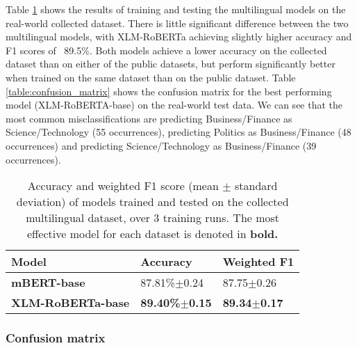 \documentclass{l4proj}
\begin{document}
Table \ref{table:realworld-effectiveness} shows the results of training and testing the multilingual models on the real-world collected dataset. There is little significant difference between the two multilingual models, with XLM-RoBERTa achieving slightly higher accuracy and F1 scores of ~89.5\%. Both models achieve a lower accuracy on the collected dataset than on either of the public datasets, but perform significantly better when trained on the same dataset than on the public dataset.
Table \ref{table:confusion_matrix} shows the confusion matrix for the best performing model (XLM-RoBERTA-base) on the real-world test data. We can see that the most common misclassifications are predicting Business/Finance as Science/Technology (55 occurrences), predicting Politics as Business/Finance (48 occurrences) and predicting Science/Technology as Business/Finance (39 occurrences).  

\begin{table}[]
\begin{tabular}{lll}
\hline
\textbf{Model}   & \textbf{Accuracy} & \textbf{Weighted F1} \\ \hline
\textbf{mBERT-base}       & 87.81\%$\pm$0.24     & 87.75$\pm$0.26        \\
\textbf{XLM-RoBERTa-base} & \textbf{89.40\%$\pm$0.15}     & \textbf{89.34$\pm$0.17}                 \\ \hline
\end{tabular}
\caption{Accuracy and weighted F1 score (mean $\pm$ standard deviation) of models trained and tested on the collected multilingual dataset, over 3 training runs. The most effective model for each dataset is denoted in \textbf{bold.}}
\label{table:realworld-effectiveness}
\end{table}

\subsubsection{Confusion matrix}
\end{document}
